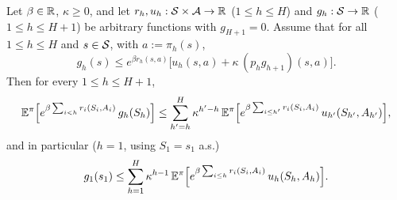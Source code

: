 \begin{lemma}\label{lem:unroll_recursion}
\leanok
{}
Let $\beta \in \mathbb{R}$, $\kappa \ge 0$, and let $r_h, u_h : \mathcal{S} \times \mathcal{A} \to \mathbb{R}$ ($1 \le h \le H$)
and $g_h : \mathcal{S} \to \mathbb{R}$ ($1 \le h \le H + 1$) be arbitrary functions with $g_{H+1} = 0$. Assume
that for all $1 \le h \le H$ and $s \in \mathcal{S}$, with $a := \pi_h(s)$,
\[
  g_h(s) \le e^{\beta r_h(s,a)}\Big[u_h(s,a) + \kappa\,(p_h g_{h+1})(s,a)\Big] .
\]
Then for every $1 \le h \le H + 1$,
\begin{equation}\label{eq:pmdp_unroll_ih}
  \mathbb{E}^\pi\Big[e^{\beta\sum_{i < h} r_i(S_i, A_i)}\,g_h(S_h)\Big]
  \le \sum_{h' = h}^{H}\kappa^{h' - h}\,\mathbb{E}^\pi\Big[e^{\beta\sum_{i \le h'} r_i(S_i,A_i)}\,u_{h'}(S_{h'}, A_{h'})\Big] ,
\end{equation}
and in particular ($h = 1$, using $S_1 = s_1$ a.s.)
\[
  g_1(s_1) \le \sum_{h = 1}^{H}\kappa^{h - 1}\,\mathbb{E}^\pi\Big[e^{\beta\sum_{i \le h} r_i(S_i,A_i)}\,u_h(S_h, A_h)\Big] .
\]
\end{lemma}

